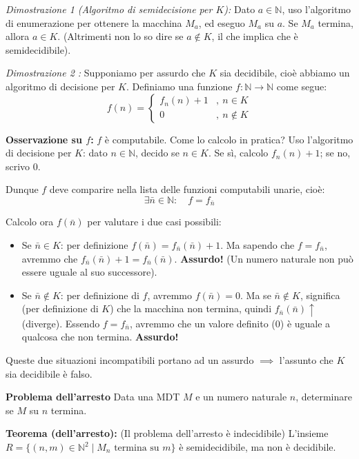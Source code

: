 \vspace{0.4cm}
\textit{Dimostrazione 1 (Algoritmo di semidecisione per $K$):}
Dato $a \in \mathbb{N}$, uso l'algoritmo di enumerazione per ottenere la macchina $M_a$, ed eseguo $M_a$ su $a$.
Se $M_a$ termina, allora $a \in K$. 
(Altrimenti non lo so dire se $a \notin K$, il che implica che è semidecidibile).

\vspace{0.4cm}
\textit{Dimostrazione 2 :}
Supponiamo per assurdo che $K$ sia decidibile, cioè abbiamo un algoritmo di decisione per $K$.
Definiamo una funzione $f: \mathbb{N} \to \mathbb{N}$ come segue:
$$ 
f(n) = \begin{cases} 
f_n(n) + 1 & , \ n \in K \\
0 & , \ n \notin K 
\end{cases} 
$$

\textbf{Osservazione su $f$:} $f$ è computabile. 
Come lo calcolo in pratica? Uso l'algoritmo di decisione per $K$: dato $n \in \mathbb{N}$, decido se $n \in K$. Se sì, calcolo $f_n(n) + 1$; se no, scrivo $0$.

Dunque $f$ deve comparire nella lista delle funzioni computabili unarie, cioè:
$$ \exists \bar{n} \in \mathbb{N} : \quad f = f_{\bar{n}} $$

Calcolo ora $f(\bar{n})$ per valutare i due casi possibili:
\begin{itemize}
    \item Se $\bar{n} \in K$: per definizione $f(\bar{n}) = f_{\bar{n}}(\bar{n}) + 1$. Ma sapendo che $f = f_{\bar{n}}$, avremmo che $f_{\bar{n}}(\bar{n}) + 1 = f_{\bar{n}}(\bar{n})$. 
    \textbf{Assurdo!} (Un numero naturale non può essere uguale al suo successore).
    
    \item Se $\bar{n} \notin K$: per definizione di $f$, avremmo $f(\bar{n}) = 0$.
    Ma se $\bar{n} \notin K$, significa (per definizione di $K$) che la macchina non termina, quindi $f_{\bar{n}}(\bar{n})\uparrow$ (diverge).
    Essendo $f = f_{\bar{n}}$, avremmo che un valore definito ($0$) è uguale a qualcosa che non termina.
    \textbf{Assurdo!}
\end{itemize}
Queste due situazioni incompatibili portano ad un assurdo $\implies$ l'assunto che $K$ sia decidibile è falso.

\vspace{0.8cm}
\textbf{Problema dell'arresto}
Data una MDT $M$ e un numero naturale $n$, determinare se $M$ su $n$ termina.

\vspace{0.4cm}
\textbf{Teorema (dell'arresto):} (Il problema dell'arresto è indecidibile)
L'insieme $R = \{(n, m) \in \mathbb{N}^2 \mid M_n \text{ termina su } m\}$ è semidecidibile, ma non è decidibile.

